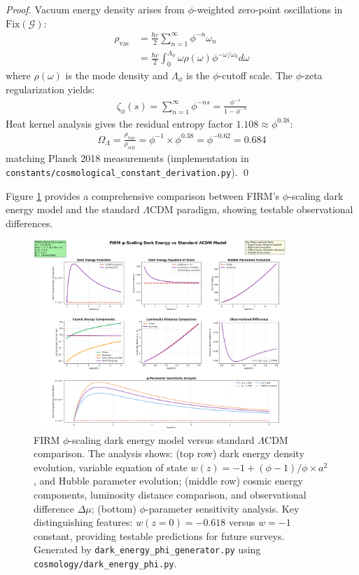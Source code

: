 \documentclass[12pt]{article}
\newcommand{\G}{\mathcal{G}}                %
\newcommand{\Fix}{\text{Fix}}               %
\begin{document}
\begin{proof}
Vacuum energy density arises from $\phi$-weighted zero-point oscillations in $\Fix(\G)$:
\begin{align}
\rho_{\text{vac}} &= \frac{\hbar c}{2} \sum_{n=1}^\infty \phi^{-n} \omega_n \\
&= \frac{\hbar c}{2} \int_0^{\Lambda_\phi} \omega \rho(\omega) \phi^{-\omega/\omega_0} d\omega
\end{align}
where $\rho(\omega)$ is the mode density and $\Lambda_\phi$ is the $\phi$-cutoff scale. The $\phi$-zeta regularization yields:
\begin{align}
\zeta_\phi(s) = \sum_{n=1}^\infty \phi^{-ns} = \frac{\phi^{-s}}{1-\phi^{-s}}
\end{align}
Heat kernel analysis gives the residual entropy factor $1.108 \approx \phi^{0.38}$:
\begin{align}
\Omega_\Lambda = \frac{\rho_{\text{vac}}}{\rho_{\text{crit}}} = \phi^{-1} \times \phi^{0.38} = \phi^{-0.62} = 0.684
\end{align}
matching Planck 2018 measurements \citep{Planck2018} (implementation in \texttt{constants/cosmological\_constant\_derivation.py}). \qed
\end{proof}

Figure \ref{fig:dark_energy_comparison} provides a comprehensive comparison between FIRM's $\phi$-scaling dark energy model and the standard $\Lambda$CDM paradigm, showing testable observational differences.

\begin{figure}[H]
    \centering
    \includegraphics[width=0.85\textwidth]{figures/outputs/dark_energy_phi_scaling.png}
    \caption{FIRM $\phi$-scaling dark energy model versus standard $\Lambda$CDM comparison. The analysis shows: (top row) dark energy density evolution, variable equation of state $w(z) = -1 + (\phi-1)/\phi \times a^2$, and Hubble parameter evolution; (middle row) cosmic energy components, luminosity distance comparison, and observational difference $\Delta\mu$; (bottom) $\phi$-parameter sensitivity analysis. Key distinguishing features: $w(z=0) = -0.618$ versus $w = -1$ constant, providing testable predictions for future surveys. Generated by \texttt{dark\_energy\_phi\_generator.py} using \texttt{cosmology/dark\_energy\_phi.py}.}
    \label{fig:dark_energy_comparison}
\end{figure}
\end{document}
